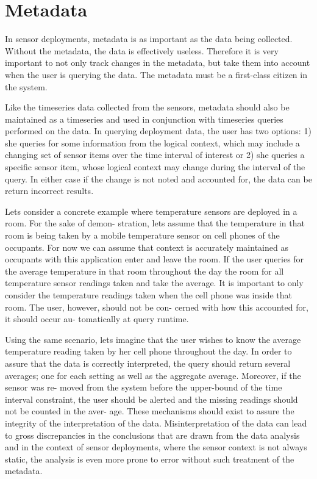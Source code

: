 
\section{Metadata}
In sensor deployments, metadata is as important as the data being collected. Without the metadata, the data is effectively useless. 
Therefore it is very important to not only track changes in the metadata, but take them into account when the user is querying 
the data. The metadata must be a first-class citizen in the system.

Like the timeseries data collected from the sensors, metadata should also be maintained as a timeseries and 
used in conjunction with timeseries queries performed on the data. In querying deployment data, the user has two 
options: 1) she queries for some information from the logical context, which may include a changing set of sensor 
items over the time interval of interest or 2) she queries a specific sensor item, whose logical context may change 
during the interval of the query. In either case if the change is not noted and accounted for, the data can be return 
incorrect results.

Lets consider a concrete example where temperature sensors are deployed in a room. For the sake of demon- stration, lets 
assume that the temperature in that room is being taken by a mobile temperature sensor on cell phones of the occupants. For 
now we can assume that
context is accurately maintained as occupants with this application enter and leave the room. If the user queries for the average temperature in that room throughout the day the room for all temperature sensor readings taken and take the average. It is important to only consider the temperature readings taken when the cell phone was inside that room. The user, however, should not be con- cerned with how this accounted for, it should occur au- tomatically at query runtime.

Using the same scenario, lets imagine that the user wishes to know the average temperature reading taken by her cell phone throughout the day. In order to assure that the data is correctly interpreted, the query should return several averages; one for each setting as well as the aggregate average. Moreover, if the sensor was re- moved from the system before the upper-bound of the time interval constraint, the user should be alerted and the missing readings should not be counted in the aver- age.
These mechanisms should exist to assure the integrity of the interpretation of the data. Misinterpretation of the data can lead to gross discrepancies in the conclusions that are drawn from the data analysis and in the context of sensor deployments, where the sensor context is not always static, the analysis is even more prone to error without such treatment of the metadata.